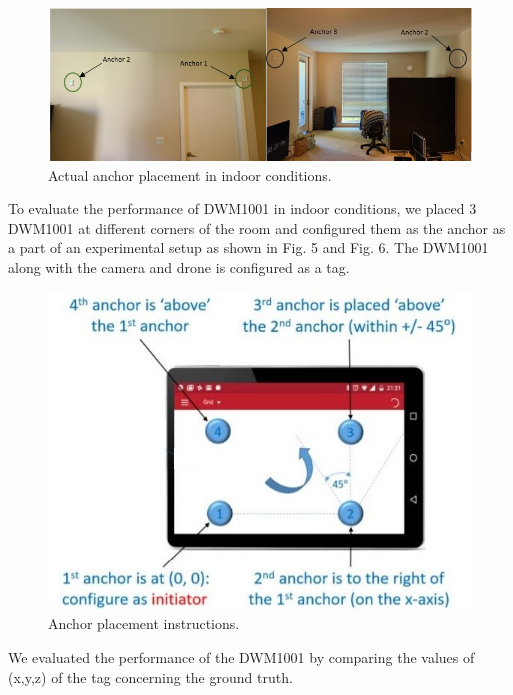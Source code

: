 \documentclass{IEEEtran}
\newcommand{\figwidthb}{0.80\linewidth}
\begin{document}
\begin{figure}[htb]
\centering
\includegraphics[width=1\linewidth,height=0.5\linewidth]{fig/anchor_position.jpg}
\caption{Actual anchor placement in indoor conditions.} \label{fig.structure}
\end{figure}

To evaluate the performance of DWM1001 in indoor conditions, we placed 3 DWM1001 at different corners of the room and configured them as the anchor as a part of an experimental setup as shown in Fig. 5 and Fig. 6. The DWM1001 along with the camera and drone is configured as a tag.

\begin{figure}[htb]
\centering
\includegraphics[width=\figwidthb]{fig/uwb_position_setup.jpg}
\caption{Anchor placement instructions.} \label{fig.structure}
\end{figure}

We evaluated the performance of the DWM1001 by comparing the values of (x,y,z) of the tag concerning the ground truth.
\end{document}
